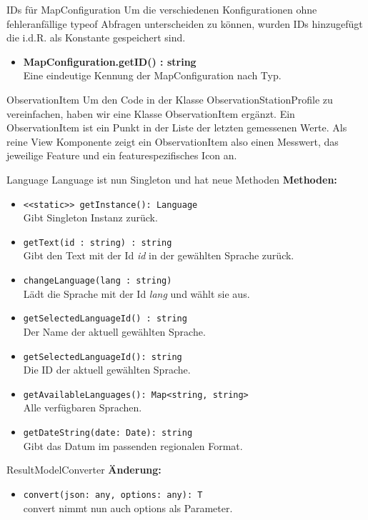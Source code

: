 \begin{Change}{IDs für MapConfiguration}
    Um die verschiedenen Konfigurationen ohne fehleranfällige typeof Abfragen unterscheiden
    zu können, wurden IDs hinzugefügt die i.d.R. als Konstante gespeichert sind.
    \begin{itemize}
        \item \textbf{MapConfiguration.getID() : string}
        \\ Eine eindeutige Kennung der MapConfiguration nach Typ.
    \end{itemize}
\end{Change}

\begin{Change}{ObservationItem}
    Um den Code in der Klasse ObservationStationProfile zu vereinfachen, haben wir eine Klasse ObservationItem ergänzt. Ein ObservationItem ist ein Punkt in der Liste der letzten gemessenen Werte. Als reine View Komponente zeigt ein ObservationItem also einen Messwert, das jeweilige Feature und ein featurespezifisches Icon an.
\end{Change}

\begin{Change}{Language}
    Language ist nun Singleton und hat neue Methoden
    \textbf{Methoden:}
    \begin{itemize}
        \item \texttt{<<static>> getInstance(): Language}
        \\Gibt Singleton Instanz zurück.
        \item \texttt{getText(id : string) : string}
        \\ Gibt den Text mit der Id \emph{id} in der gewählten Sprache zurück.
        \item \texttt{changeLanguage(lang : string)}
        \\ Lädt die Sprache mit der Id \emph{lang} und wählt sie aus.
        \item \texttt{getSelectedLanguageId() : string}
        \\ Der Name der aktuell gewählten Sprache.
        \item \texttt{getSelectedLanguageId(): string}
        \\ Die ID der aktuell gewählten Sprache.
        \item \texttt{getAvailableLanguages(): Map<string, string>}
        \\ Alle verfügbaren Sprachen.
        \item \texttt{getDateString(date: Date): string}
        \\ Gibt das Datum im passenden regionalen Format.
    \end{itemize}
\end{Change}

\begin{Change}{ResultModelConverter}
    \textbf{Änderung:}
    \begin{itemize}
        \item \texttt{convert(json: any, options: any): T}
        \\convert nimmt nun auch options als Parameter.
    \end{itemize}
\end{Change}